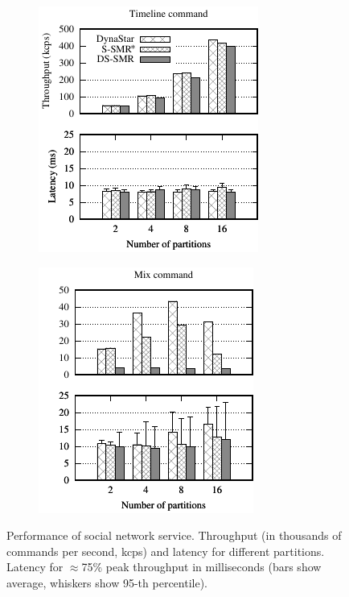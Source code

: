 \begin{figure}[h!]
  \centering
  \begin{subfigure}{.35\textwidth}
    \includegraphics[width=.9\textwidth]{figures/experiments/chirper-compare-timeline}
    \caption{}
  \end{subfigure}
  \begin{subfigure}{.35\textwidth}
    \includegraphics[width=.9\textwidth]{figures/experiments/chirper-compare-mix}
    \caption{}
  \end{subfigure}
  \caption{Performance of social network service. Throughput (in thousands of commands per second, kcps) and latency for different partitions. 
  Latency for $\approx$75\% peak throughput in milliseconds (bars show average, whiskers show 95-th percentile).}
  \label{fig:socialscalability}
\end{figure}
